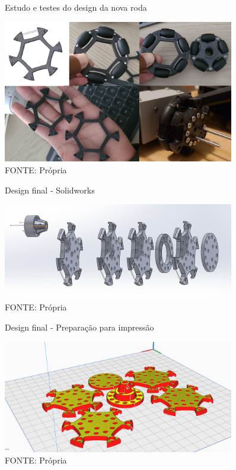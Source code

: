 \begin{figure}[h]
	\centering
	\caption{Estudo e testes do design da nova roda}
	\label{estudo_design}
	\includegraphics[width=0.9\textwidth]{figures/estudo_roda}
    \caption*{FONTE: Própria}
\end{figure}

\begin{figure}[h]
	\centering
	\caption{Design final - Solidworks}
	\label{design_solid}
	\includegraphics[width=0.9\textwidth]{figures/roda_processo_desing_passo2}
    \caption*{FONTE: Própria}
\end{figure}

\begin{figure}[h]
	\centering
	\caption{Design final - Preparação para impressão}
	\label{design_impressao}
	\includegraphics[width=0.9\textwidth]{figures/roda_processo_desing_passo3}
    \caption*{FONTE: Própria}
\end{figure}

